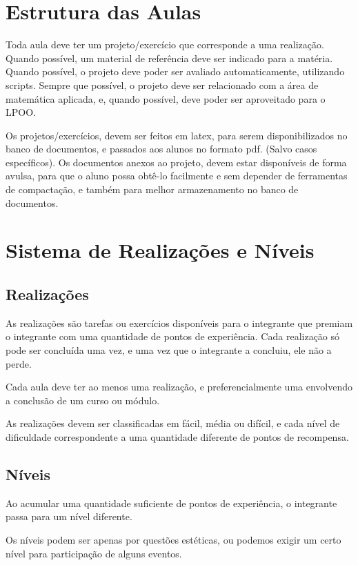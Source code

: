 \documentclass[a4paper,11pt]{report}
\numberwithin{equation}{section}
\begin{document}
\chapter{Estrutura das Aulas}

Toda aula deve ter um projeto/exercício que corresponde a uma realização.
Quando possível, um material de referência deve ser indicado para a matéria.
Quando possível, o projeto deve poder ser avaliado automaticamente, utilizando
scripts.
Sempre que possível, o projeto deve ser relacionado com a área de
matemática aplicada, e, quando possível, deve poder ser aproveitado para o 
LPOO.

Os projetos/exercícios, devem ser feitos em latex, para serem disponibilizados
no banco de documentos, e passados aos alunos no formato pdf. (Salvo casos
específicos).
Os documentos anexos ao projeto, devem estar disponíveis de forma avulsa,
para que o aluno possa obtê-lo facilmente e sem depender de ferramentas de
compactação, e também para melhor armazenamento no banco de documentos.

\chapter{Sistema de Realizações e Níveis}

\section{ Realizações }

As realizações são tarefas ou exercícios disponíveis para
o integrante que premiam o integrante com uma quantidade de pontos
de experiência.
Cada realização só pode ser concluída uma vez, e uma vez
que o integrante a concluiu, ele não a perde.

Cada aula deve ter ao menos uma realização, e preferencialmente
uma envolvendo a conclusão de um curso ou módulo. 

As realizações devem ser classificadas em fácil, média ou
difícil, e cada nível de dificuldade correspondente a uma
quantidade diferente de pontos de recompensa.

\section{ Níveis }

Ao acumular uma quantidade suficiente de pontos de experiência, o 
integrante passa para um nível diferente.

Os níveis podem ser apenas por questões estéticas, ou podemos
exigir um certo nível para participação de alguns eventos.
\end{document}
